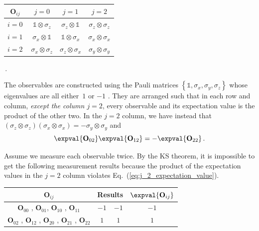 \documentclass[english,reprint, aps, prl,superscriptaddress, showpacs,
showkeys, longbibliography, amsmath, amssymb, floatfix]{revtex4-1}
\theoremstyle{plain}
\theoremstyle{definition}
\begin{document}
{\renewcommand{\arraystretch}{2}%
\begin{center} 
\begin{tabular}{r|@{\quad}c@{\quad}|@{\quad}c@{\quad}|@{\quad}c@{\quad}|} 
$\mathbf{O}_{ij}$~ & $j=0$ & $j=1$ & $j=2$ \\ 
\hline  
$i=0~$ & $\mathbb{1}\otimes\sigma_{z}$  & $\sigma_{z}\otimes\mathbb{1}$  & $\sigma_{z}\otimes\sigma_{z}$ \tabularnewline 
\hline  
$i=1~$ & $\sigma_{x}\otimes\mathbb{1}$  & $\mathbb{1}\otimes\sigma_{x}$  & $\sigma_{x}\otimes\sigma_{x}$ \tabularnewline 
\hline  
$i=2~$ & $\sigma_{x}\otimes\sigma_{z}$  & $\sigma_{z}\otimes\sigma_{x}$  & $\sigma_{y}\otimes\sigma_{y}$ \tabularnewline 
\hline  
\end{tabular}\,.
\par\end{center} 
}

\noindent The observables are constructed using the Pauli matrices
$\left\{ \mathbb{1},\sigma_{x},\sigma_{y},\sigma_{z}\right\} $ whose
eigenvalues are all either~$1$ or $-1$ \cite{Redhead1987-REDINA,544199,Griffiths2003,Jaeger2007,Mermin2007}.
They are arranged such that in each row and column, \emph{except the
column $j=2$}, every observable and its expectation value is the
product of the other two. In the $j=2$ column, we have instead that
$\left(\sigma_{z}\otimes\sigma_{z}\right)\left(\sigma_{x}\otimes\sigma_{x}\right)=-\sigma_{y}\otimes\sigma_{y}$
and 
\begin{equation}
\expval{\mathbf{O}_{02}}\expval{\mathbf{O}_{12}}=-\expval{\mathbf{O}_{22}}\,.\label{eq:j_2_expectation_value}
\end{equation}

Assume we measure each observable twice. By the KS theorem, it is
impossible to get the following measurement results because the product
of the expectation values in the $j=2$ column violates Eq.~(\ref{eq:j_2_expectation_value}).
\begin{center}
\begin{tabular}{cccc}
\toprule 
\addlinespace
$\mathbf{O}_{ij}$  & \multicolumn{2}{c}{Results} & $\expval{\mathbf{O}_{ij}}$\tabularnewline
\midrule
\midrule 
\addlinespace
$\mathbf{O}_{00}$ , $\mathbf{O}_{01}$, $\mathbf{O}_{10}$ , $\mathbf{O}_{11}$  & $-1$ & $-1$ & $-1$\tabularnewline
\midrule 
\addlinespace
$\mathbf{O}_{02}$ , $\mathbf{O}_{12}$ , $\mathbf{O}_{20}$ , $\mathbf{O}_{21}$
, $\mathbf{O}_{22}$  & $1$ & $1$ & $1$\tabularnewline
\bottomrule
\end{tabular}
\par\end{center}
\end{document}
